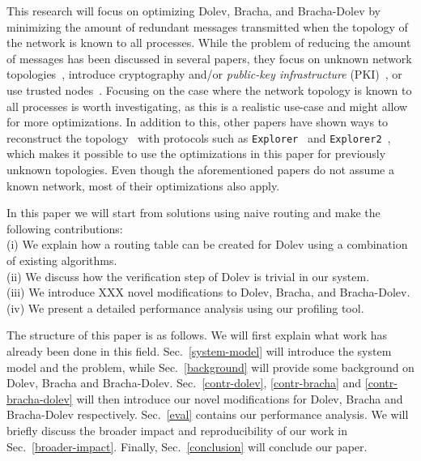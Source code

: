 This research will focus on optimizing Dolev, Bracha, and Bracha-Dolev by minimizing the amount of redundant messages transmitted when the topology of the network is known to all processes. While the problem of reducing the amount of messages has been discussed in several papers, they focus on unknown network topologies~\cite{bonomi2021practical,bonomi2019multihop,dolev-improvement}, introduce cryptography and/or \textit{public-key infrastructure} (PKI)~\cite{signatures-crypo-1,pki-crypto-2}, or use trusted nodes~\cite{using-tee}. Focusing on the case where the network topology is known to all processes is worth investigating, as this is a realistic use-case and might allow for more optimizations. In addition to this, other papers have shown ways to reconstruct the topology~\cite{topology-discovery} with protocols such as \texttt{Explorer}~\cite{explorer} and \texttt{Explorer2}~\cite{explorer2}, which makes it possible to use the optimizations in this paper for previously unknown topologies.
Even though the aforementioned papers do not assume a known network, most of their optimizations also apply.

In this paper we will start from solutions using naive routing and make the following contributions:\\
(i) We explain how a routing table can be created for Dolev using a combination of existing algorithms.\\
(ii) We discuss how the verification step of Dolev is trivial in our system.\\
(iii) We introduce XXX novel modifications to Dolev, Bracha, and Bracha-Dolev.\\
(iv) We present a detailed performance analysis using our profiling tool.

The structure of this paper is as follows. We will first explain what work has already been done in this field. Sec.~\ref{system-model} will introduce the system model and the problem, while Sec.~\ref{background} will provide some background on Dolev, Bracha and Bracha-Dolev. Sec.~\ref{contr-dolev}, \ref{contr-bracha} and \ref{contr-bracha-dolev} will then introduce our novel modifications for Dolev, Bracha and Bracha-Dolev respectively. Sec.~\ref{eval} contains our performance analysis. We will briefly discuss the broader impact and reproducibility of our work in Sec.~\ref{broader-impact}. Finally, Sec.~\ref{conclusion} will conclude our paper.

